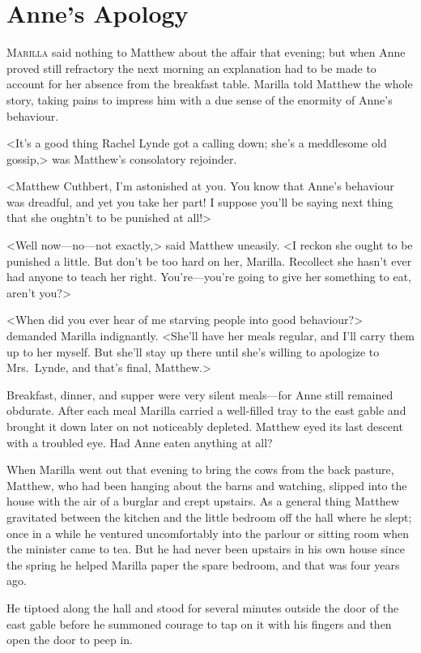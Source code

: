 \chapter{Anne's Apology}

\lettrine[]{M}{arilla} said nothing to Matthew about the affair that evening; but when Anne proved still refractory the next morning an explanation had to be made to account for her absence from the breakfast table. Marilla told Matthew the whole story, taking pains to impress him with a due sense of the enormity of Anne's behaviour.

<It's a good thing Rachel Lynde got a calling down; she's a meddlesome old gossip,> was Matthew's consolatory rejoinder.

<Matthew Cuthbert, I'm astonished at you. You know that Anne's behaviour was dreadful, and yet you take her part! I suppose you'll be saying next thing that she oughtn't to be punished at all!>

<Well now—no—not exactly,> said Matthew uneasily. <I reckon she ought to be punished a little. But don't be too hard on her, Marilla. Recollect she hasn't ever had anyone to teach her right. You're—you're going to give her something to eat, aren't you?>

<When did you ever hear of me starving people into good behaviour?> demanded Marilla indignantly. <She'll have her meals regular, and I'll carry them up to her myself. But she'll stay up there until she's willing to apologize to Mrs.~Lynde, and that's final, Matthew.>

Breakfast, dinner, and supper were very silent meals—for Anne still remained obdurate. After each meal Marilla carried a well-filled tray to the east gable and brought it down later on not noticeably depleted. Matthew eyed its last descent with a troubled eye. Had Anne eaten anything at all?

When Marilla went out that evening to bring the cows from the back pasture, Matthew, who had been hanging about the barns and watching, slipped into the house with the air of a burglar and crept upstairs. As a general thing Matthew gravitated between the kitchen and the little bedroom off the hall where he slept; once in a while he ventured uncomfortably into the parlour or sitting room when the minister came to tea. But he had never been upstairs in his own house since the spring he helped Marilla paper the spare bedroom, and that was four years ago.

He tiptoed along the hall and stood for several minutes outside the door of the east gable before he summoned courage to tap on it with his fingers and then open the door to peep in.


